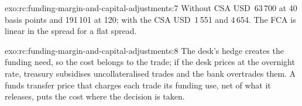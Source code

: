 \begin{solution}{exo:rc:funding-margin-and-capital-adjustments:7}
Without CSA USD~63\,700 at 40 basis points and 191\,101 at 120; with the CSA USD~1\,551 and 4\,654.
The FCA is linear in the spread for a flat spread.
\end{solution}

\begin{solution}{exo:rc:funding-margin-and-capital-adjustments:8}
The desk's hedge creates the funding need, so the cost belongs to the trade; if the desk
prices at the overnight rate, treasury subsidises uncollateralised trades and the bank
overtrades them. A funds transfer price that charges each trade its funding use, net of what
it releases, puts the cost where the decision is taken.
\end{solution}

